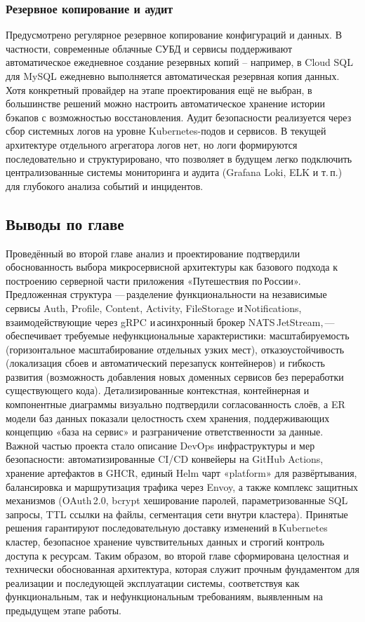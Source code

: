 \subsubsection*{Резервное копирование и аудит}
Предусмотрено регулярное резервное копирование конфигураций и данных. В частности, современные облачные СУБД и сервисы поддерживают автоматическое ежедневное создание резервных копий – например, в Cloud SQL для MySQL ежедневно выполняется автоматическая резервная копия данных. Хотя конкретный провайдер на этапе проектирования ещё не выбран, в большинстве решений можно настроить автоматическое хранение истории бэкапов с возможностью восстановления. Аудит безопасности реализуется через сбор системных логов на уровне Kubernetes-подов и сервисов. В текущей архитектуре отдельного агрегатора логов нет, но логи формируются последовательно и структурировано, что позволяет в будущем легко подключить централизованные системы мониторинга и аудита (Grafana Loki, ELK и т. п.) для глубокого анализа событий и инцидентов.

\subsection*{Выводы по главе}
Проведённый во второй главе анализ и проектирование подтвердили обоснованность выбора микросервисной архитектуры как базового подхода к построению серверной части приложения «Путешествия по России». Предложенная структура — разделение функциональности на независимые сервисы Auth, Profile, Content, Activity, FileStorage и Notifications, взаимодействующие через gRPC и асинхронный брокер NATS JetStream, — обеспечивает требуемые нефункциональные характеристики: масштабируемость (горизонтальное масштабирование отдельных узких мест), отказоустойчивость (локализация сбоев и автоматический перезапуск контейнеров) и гибкость развития (возможность добавления новых доменных сервисов без переработки существующего кода). Детализированные контекстная, контейнерная и компонентные диаграммы визуально подтвердили согласованность слоёв, а ER модели баз данных показали целостность схем хранения, поддерживающих концепцию «база на сервис» и разграничение ответственности за данные.
Важной частью проекта стало описание DevOps инфраструктуры и мер безопасности: автоматизированные CI/CD конвейеры на GitHub Actions, хранение артефактов в GHCR, единый Helm чарт «platform» для развёртывания, балансировка и маршрутизация трафика через Envoy, а также комплекс защитных механизмов (OAuth 2.0, bcrypt хеширование паролей, параметризованные SQL запросы, TTL ссылки на файлы, сегментация сети внутри кластера). Принятые решения гарантируют последовательную доставку изменений в Kubernetes кластер, безопасное хранение чувствительных данных и строгий контроль доступа к ресурсам. Таким образом, во второй главе сформирована целостная и технически обоснованная архитектура, которая служит прочным фундаментом для реализации и последующей эксплуатации системы, соответствуя как функциональным, так и нефункциональным требованиям, выявленным на предыдущем этапе работы.

